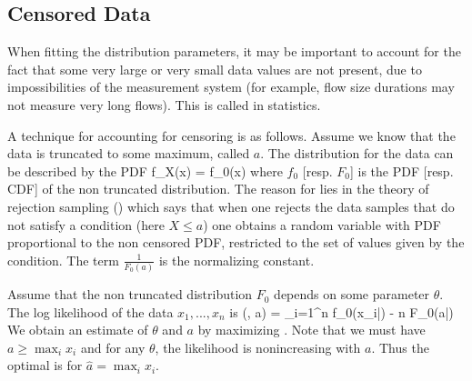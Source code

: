 
\subsection{Censored Data}

When fitting the distribution parameters, it may
be important to account for the fact that some
very large or very small data values are not
present, due to impossibilities of the
measurement system (for example, flow size
durations may not measure very long flows). This
is called  in statistics.

A technique for accounting for censoring is as
follows. Assume we know that the data is
truncated to some maximum, called  $a$. The
distribution for the data can be described by the
PDF
%
  \be
f_X(x) =  f_0(x) 
\label{eq-cens-pdf}
  \ee
%
where $f_0$ [resp. $F_0$] is the PDF [resp. CDF]
of the non truncated distribution. The reason for
 lies in the theory of
rejection sampling () which
says that when one rejects the data samples that
do not satisfy a condition (here $X\leq a$) one
obtains a random variable with PDF proportional
to the non censored PDF, restricted to the set of
values given by the condition. The term
$\frac{1}{F_0(a)}$ is the normalizing constant.

Assume that the non truncated distribution $F_0$
depends on some parameter $\theta$. The log
likelihood of the data $x_1, ...,x_n$ is
 \be
\ell(\theta, a) = \sum_{i=1}^n \log
f_0(x_i|\theta) - n \log F_0(a|\theta)
\label{eq-mle-cs-ln}
 \ee
We obtain an estimate of $\theta$ and $a$ by
maximizing . Note that we must
have $a \geq \max_i{x_i}$ and for any $\theta$,
the likelihood is nonincreasing with $a$. Thus
the optimal is for $\hat{a}=\max_{i}x_i$.

